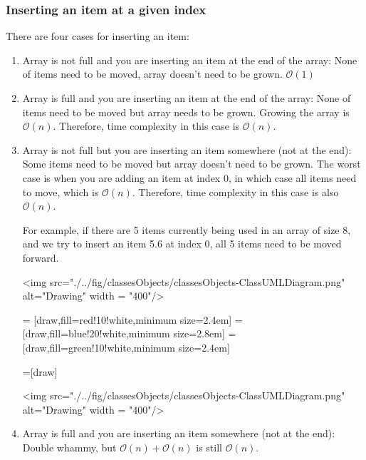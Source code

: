 \subsubsection{Inserting an item at a given index}

There are four cases for inserting an item:

\begin{enumerate}

\item Array is not full and you are inserting an item at the end of the array: None of items need to be moved, array doesn't need to be grown. $\mathcal{O}(1)$
\item Array is full and you are inserting an item at the end of the array: None of items need to be moved but array needs to be grown. Growing the array is $\mathcal{O}(n)$. Therefore, time complexity in this case is $\mathcal{O}(n)$.
\item Array is not full but you are inserting an item somewhere (not at the end): Some items need to be moved but array doesn't need to be grown. The worst case is when you are adding an item at index 0, in which case all items need to move, which is $\mathcal{O}(n)$. Therefore, time complexity in this case is also $\mathcal{O}(n)$.

For example, if there are 5 items currently being used in an array of size 8, and we try to insert an item 5.6 at index 0, all 5 items need to be moved forward.

<img src="./../fig/classesObjects/classesObjects-ClassUMLDiagram.png" alt="Drawing" width = "400"/>

 = [draw,fill=red!10!white,minimum size=2.4em]
 = [draw,fill=blue!20!white,minimum size=2.8em]
 = [draw,fill=green!10!white,minimum size=2.4em]

\newcommand{\data}{{{12.5, 6.4, 8.5, 9.6, -3.4, 0, 0, 0},
					{12.5, 6.4, 8.5, 9.6, -3.4, -3.4, 0, 0},
					{12.5, 6.4, 8.5, 9.6, 9.6, -3.4, 0, 0},
					{12.5, 6.4, 8.5, 8.5, 9.6, -3.4, 0, 0},
					{12.5, 6.4, 6.4, 8.5, 9.6, -3.4, 0, 0},
					{12.5, 12.5, 6.4, 8.5, 9.6, -3.4, 0, 0},
					{6.4, 12.5, 6.4, 8.5, 9.6, -3.4, 0, 0}}}
					
=[draw] %

<img src="./../fig/classesObjects/classesObjects-ClassUMLDiagram.png" alt="Drawing" width = "400"/>

\item Array is full and you are inserting an item somewhere (not at the end): Double whammy, but  $\mathcal{O}(n) + \mathcal{O}(n)$ is still $\mathcal{O}(n)$.
\end{enumerate}

